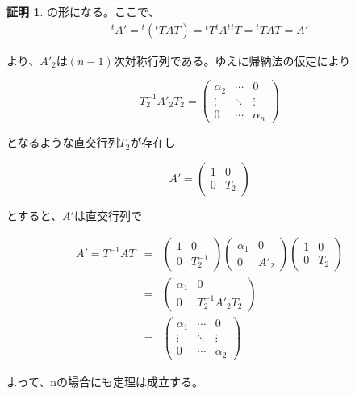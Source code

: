 \documentclass[dvipdfmx,autodetect-engine]{jsarticle}
\theoremstyle{definition}
\newtheorem*{Proof*}{証明}
\newcommand{\transposeMat}[1]{{}^t\!{#1}}
\begin{document}
{\begin{Proof*}
の形になる。ここで、\begin{eqnarray*}
\transposeMat{A}' = \transposeMat{(\transposeMat{T}AT)} = \transposeMat{T}\transposeMat{A}\transposeMat{\transposeMat{T}} = \transposeMat{T}AT = A'
\end{eqnarray*}

より、$A'_2$は$(n-1)$次対称行列である。ゆえに帰納法の仮定により

$$
T_2^{-1}A'_2T_2 = \begin{pmatrix}
\alpha_2 & \cdots & 0 \\
\vdots & \ddots & \vdots \\
0 & \cdots & \alpha_n
\end{pmatrix}
$$

となるような直交行列$T_2$が存在し

$$
A' = \begin{pmatrix}
1 & 0 \\
0 & T_2
\end{pmatrix}
$$

とすると、$A'$は直交行列で

\begin{eqnarray*}
A' = T^{-1}AT &=& \begin{pmatrix}
1 & 0 \\
0 & T_2^{-1}
\end{pmatrix}\begin{pmatrix}
\alpha_1 & 0 \\
0 & A'_2
\end{pmatrix}\begin{pmatrix}
1 & 0 \\
0 & T_2
\end{pmatrix} \\[1.5ex]
&=& \begin{pmatrix}
\alpha_1 & 0 \\
0 & T_2^{-1}A'_2T_2
\end{pmatrix} \\[1.5ex]
&=& \begin{pmatrix}
\alpha_1 & \cdots & 0 \\
\vdots & \ddots & \vdots \\
0 & \cdots & \alpha_2
\end{pmatrix}
\end{eqnarray*}

よって、nの場合にも定理は成立する。

\end{Proof*}
}
\end{document}
